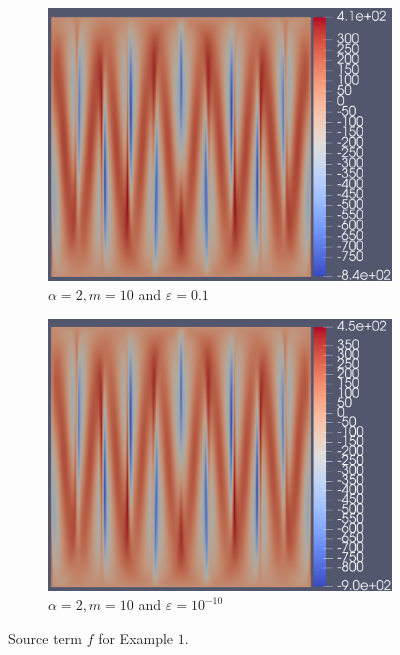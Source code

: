 \documentclass[12pt]{ociamthesis}
\begin{document}
\begin{figure}[H]
\begin{subfigure}{0.5\textwidth}
     \includegraphics[width=\textwidth]{Pics/uf/F_E1c_eps_1.png}
     \caption{$\alpha=2, m=10$ and $\varepsilon = 0.1$}
 \end{subfigure}
 \hfill
 \begin{subfigure}{0.5\textwidth}
     \includegraphics[width=\textwidth]{Pics/uf/f_E1c_eps_10.png}
     \caption{$\alpha=2, m=10$ and $\varepsilon = 10^{-10}$}
 \end{subfigure}
 \caption{Source term $f$ for Example $1$.} \label{E1_fs}
\end{figure}
\end{document}
